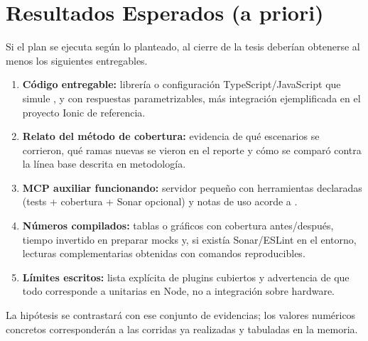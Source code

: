 \section{Resultados Esperados (a priori)}
\label{chap:resultados_esperados}

Si el plan se ejecuta según lo planteado, al cierre de la tesis deberían obtenerse al menos los siguientes entregables.

\begin{enumerate}
    \item \textbf{Código entregable:} librería o configuración TypeScript/JavaScript que simule ,  y  con respuestas parametrizables, más integración ejemplificada en el proyecto Ionic de referencia.
    \item \textbf{Relato del método de cobertura:} evidencia de qué escenarios se corrieron, qué ramas nuevas se vieron en el reporte y cómo se comparó contra la línea base descrita en metodología.
    \item \textbf{MCP auxiliar funcionando:} servidor pequeño con herramientas declaradas (tests + cobertura + Sonar opcional) y notas de uso acorde a \cite{mcp-spec2025}.
    \item \textbf{Números compilados:} tablas o gráficos con cobertura antes/después, tiempo invertido en preparar mocks y, si existía Sonar/ESLint en el entorno, lecturas complementarias obtenidas con comandos reproducibles.
    \item \textbf{Límites escritos:} lista explícita de plugins cubiertos y advertencia de que todo corresponde a unitarias en Node, no a integración sobre hardware.
\end{enumerate}

La hipótesis se contrastará con ese conjunto de evidencias; los valores numéricos concretos corresponderán a las corridas ya realizadas y tabuladas en la memoria.
